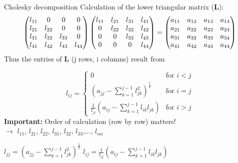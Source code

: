 \begin{vbframe}{Cholesky decomposition}
Calculation of the lower triangular matrix ($\mathbf{L}$):
\begin{eqnarray*}
\begin{pmatrix} 
l_{11} & 0 & 0 & 0 \\
l_{21} & l_{22} & 0 & 0 \\
l_{31} & l_{32} & l_{33} & 0 \\
l_{41} & l_{42} & l_{43} & l_{44}  \end{pmatrix}
\begin{pmatrix} 
l_{11} & l_{21} & l_{31} & l_{41} \\
0 & l_{22} & l_{32} & l_{42} \\
0 & 0 & l_{33} & l_{43} \\
0 & 0 & 0 & l_{44}  \end{pmatrix}
= \begin{pmatrix} 
a_{11} & a_{12} & a_{13} & a_{14} \\
a_{21} & a_{22} & a_{23} & a_{24} \\
a_{31} & a_{32} & a_{33} & a_{34} \\
a_{41} & a_{42} & a_{43} & a_{44}  \end{pmatrix}
\end{eqnarray*}
Thus the entries of $\mathbf{L}$ (j rows, i columns) result from


$$
l_{ij} =
\begin{cases}
0 & \text{for } i < j \\[5pt]
(a_{jj} - \sum_{k = 1}^{j - 1}l_{jk}^2)^{\frac{1}{2}} & \text{for } i = j \\[5pt]
\frac{1}{l_{jj}} (a_{ij} - \sum_{k = 1}^{j - 1}l_{ik}l_{jk}) & \text{for } i > j
\end{cases}
$$
\medskip
\textbf{Important: } Order of calculation (row by row) matters!\\
$\rightarrow$ $l_{11}$, $l_{21}$, $l_{22}$, $l_{31}$, $l_{32}$, $l_{33}$,..., $l_{nn}$



\framebreak

\begin{algorithm}[H]
  \caption{Cholesky decomposition}
  \begin{algorithmic}[1]
    \State $l_{jj} = \left(a_{jj} - \sum_{k = 1}^{j - 1}l_{jk}^2\right)^{\frac{1}{2}}$
      \State $l_{ij} =
  \frac{1}{l_{jj}}\left(a_{ij} - \sum_{k = 1}^{j - 1}l_{ik}l_{jk}\right)$
    \EndFor
  \EndFor
  \end{algorithmic}
\end{algorithm}


\end{vbframe}
